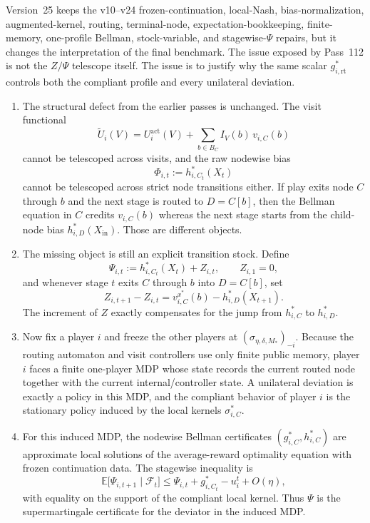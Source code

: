 \documentclass[12pt]{article}
\theoremstyle{definition}
\newcommand{\E}{\mathbb{E}}
\newcommand{\1}{\mathbf{1}}
\newcommand{\cF}{\mathcal{F}}
\begin{document}
Version~25 keeps the v10--v24 frozen-continuation, local-Nash,
bias-normalization, augmented-kernel, routing, terminal-node,
expectation-bookkeeping, finite-memory, one-profile Bellman, stock-variable,
and stagewise-$\Psi$ repairs, but it changes the interpretation of the final
benchmark. The issue exposed by Pass~112 is not the $Z/\Psi$ telescope itself.
The issue is to justify why the same scalar $g_{i,\mathrm{rt}}^*$ controls both
the compliant profile and every unilateral deviation.

\begin{enumerate}[label=\textnormal{(\arabic*)},leftmargin=2.4em]
\item The structural defect from the earlier passes is unchanged. The visit
functional
\[
\widetilde U_i(V)=U_i^{\mathrm{act}}(V)+\sum_{b\in B_C}I_V(b)\,v_{i,C}(b)
\]
cannot be telescoped across visits, and the raw nodewise bias
\[
\Phi_{i,t}:=h_{i,C_t}^*(X_t)
\]
cannot be telescoped across strict node transitions either. If play exits node
$C$ through $b$ and the next stage is routed to $D=C[b]$, then the Bellman
equation in $C$ credits $v_{i,C}(b)$ whereas the next stage starts from the
child-node bias $h_{i,D}^*(X_{\mathrm{in}})$. Those are different objects.

\item The missing object is still an explicit transition stock. Define
\[
\Psi_{i,t}:=h_{i,C_t}^*(X_t)+Z_{i,t},
\qquad
Z_{i,1}=0,
\]
and whenever stage $t$ exits $C$ through $b$ into $D=C[b]$, set
\[
Z_{i,t+1}-Z_{i,t}=v_{i,C}^{x^*}(b)-h_{i,D}^*(X_{t+1}).
\]
The increment of $Z$ exactly compensates for the jump from $h_{i,C}^*$ to
$h_{i,D}^*$.

\item Now fix a player $i$ and freeze the other players at
$(\sigma_{\eta,\delta,M_*})_{-i}$. Because the routing automaton and visit
controllers use only finite public memory, player $i$ faces a finite one-player
MDP whose state records the current routed node together with the current
internal/controller state. A unilateral deviation is exactly a policy in this
MDP, and the compliant behavior of player $i$ is the stationary policy induced
by the local kernels $\sigma_{i,C}^*$.

\item For this induced MDP, the nodewise Bellman certificates
$(g_{i,C}^*,h_{i,C}^*)$ are approximate local solutions of the average-reward
optimality equation with frozen continuation data. The stagewise inequality is
\[
\E\bigl[\Psi_{i,t+1}\mid \cF_t\bigr]
\le
\Psi_{i,t}+g_{i,C_t}^*-u_i^t+O(\eta),
\]
with equality on the support of the compliant local kernel. Thus $\Psi$ is the
supermartingale certificate for the deviator in the induced MDP.


\end{enumerate}
\end{document}
